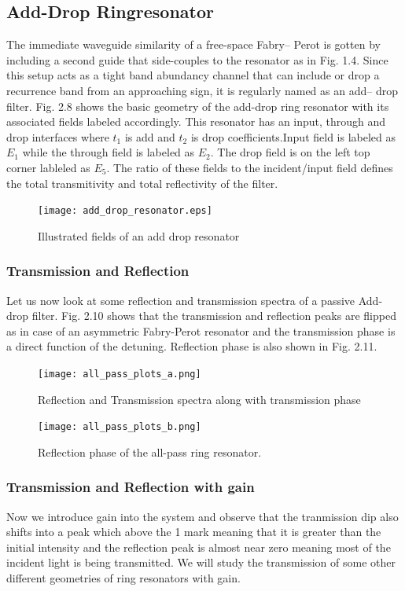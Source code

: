 \subsection{Add-Drop Ringresonator}
The immediate waveguide similarity of a free-space Fabry– Perot is gotten by including a second guide that side-couples to the resonator as in Fig. 1.4.
Since this setup acts as a tight band abundancy channel that can include or drop a recurrence band from an approaching sign, it is regularly named as an add– drop filter. Fig. 2.8 shows the basic geometry of the add-drop ring resonator with its associated fields labeled accordingly. This resonator has an input, through and drop interfaces where $t_{1}$ is add and $t_{2}$ is drop coefficients.Input field is labeled as $E_{1}$ while the through field is labeled as $E_{2}$. The drop field is on the left top corner lableled as $E_{5}$. The ratio of these fields to the incident/input field defines the total transmitivity and total reflectivity of the filter. 
\begin{figure}[h]
\centering
\texttt{[image: add\_drop\_resonator.eps]}
\caption{Illustrated fields of an add drop resonator}
\end{figure}

\subsubsection{Transmission and Reflection}
Let us now look at some reflection and transmission spectra of a passive Add- drop filter. Fig. 2.10 shows that the transmission and reflection peaks are flipped as in case of an asymmetric Fabry-Perot resonator and the transmission phase is a direct function of the detuning. Reflection phase is also shown in Fig. 2.11.

\begin{figure}[h]
\centering
\texttt{[image: all\_pass\_plots\_a.png]}
\caption{Reflection and Transmission spectra along with transmission phase} 
\end{figure}
\newpage
\begin{figure}[t]
\centering
\texttt{[image: all\_pass\_plots\_b.png]}
\caption{Reflection phase of the all-pass ring resonator.}
\end{figure}

\subsubsection{Transmission and Reflection with gain}
Now we introduce gain into the system and observe that the tranmission dip also shifts into a peak which above the 1 mark meaning that it is greater than the initial intensity and the reflection peak is almost near zero meaning most of the incident light is being transmitted. We will study the transmission of some other different geometries of ring resonators with gain. 


